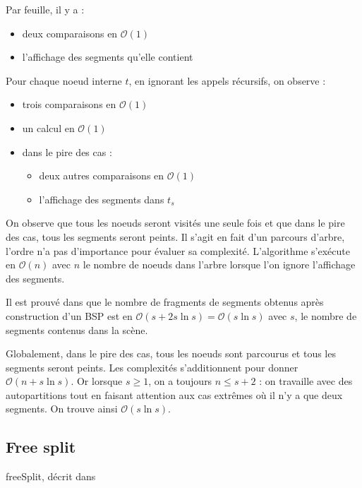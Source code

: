 \documentclass[12pt,twocolumn]{article}
\newcommand{\bigO}{\mathcal{O}}
\newcommand{\es}{\emptyset}
\begin{document}
Par feuille, il y a :
\begin{itemize}
	\item deux comparaisons en $\bigO(1)$
	\item l'affichage des segments qu'elle contient
\end{itemize}

Pour chaque noeud interne $t$, en ignorant les appels récursifs, on observe :
\begin{itemize}
	\item trois comparaisons en $\bigO(1)$
	\item un calcul en $\bigO(1)$
	\item dans le pire des cas :
		\begin{itemize}
			\item deux autres comparaisons en $\bigO(1)$
			\item l'affichage des segments dans $t_s$
		\end{itemize}
\end{itemize}

On observe que tous les noeuds seront visités une seule fois et que dans le pire
des cas, tous les segments seront peints. Il s'agit en fait d'un parcours
d'arbre, l'ordre n'a pas d'importance pour évaluer sa complexité. L'algorithme
s'exécute en $\bigO(n)$ avec $n$ le nombre de noeuds dans l'arbre
lorsque l'on ignore l'affichage des segments.

Il est prouvé dans \cite[p.~258]{cg} que
le nombre de fragments de segments obtenus après construction d'un BSP
est en $\bigO(s+2s\ln s)=\bigO(s\ln s)$ avec $s$, le nombre
de segments contenus dans la scène.

Globalement, dans le pire des cas, tous les noeuds sont parcourus et
tous les segments seront peints. Les complexités s'additionnent pour donner
$\bigO(n+s\ln s)$. Or lorsque $s\geq1$, on a toujours $n\leq s+2$ :
on travaille avec des autopartitions
tout en faisant attention aux cas extrêmes où il n'y a que deux segments.
On trouve ainsi $\bigO(s\ln s)$.


\subsection{Free split}
\begin{algorithm}
\caption{freeSplit, décrit dans \cite[p.~257]{cg}}
\SetAlgoLined\DontPrintSemicolon
\KwData{$r \neq \es$}
 {
	 {
	}
}
 
~
\end{algorithm}
\end{document}

